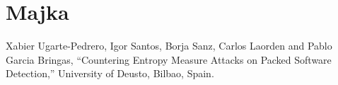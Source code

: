\documentclass[conference]{IEEEtran}
\begin{document}
\section{Majka}

\begin{thebibliography}{00}
 Xabier Ugarte-Pedrero, Igor Santos, Borja Sanz, Carlos Laorden and Pablo Garcia Bringas, ``Countering Entropy Measure Attacks on Packed
Software Detection,'' University of Deusto, Bilbao, Spain.

\end{thebibliography}
\vspace{12pt}
\color{red}
\end{document}
